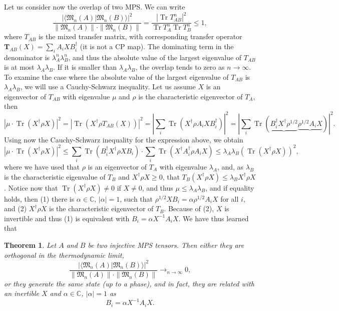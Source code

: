 \documentclass{article}
\newtheorem{theorem}{Theorem}
\newcommand{\tr}{\operatorname{Tr}}
\newcommand{\scalprod}[2]{\langle #1 \vert #2 \rangle}
\begin{document}
Let us consider now the overlap of two MPS. We can write
\begin{equation*}
  \frac{|\scalprod{\mathfrak{M}_n(A)}{\mathfrak{M}_n(B)}|^2}{\|\mathfrak{M}_n(A)\|\cdot\|\mathfrak{M}_n(B)\|} = \frac{|\tr T_{AB}^n|^2}{\tr T_A^n \tr T_B^n} \leq 1,
\end{equation*}
where $T_{AB}$ is the mixed transfer matrix, with corresponding transfer operator $\mathbf{T}_{AB}(X) = \sum_i A_i X B_i^\dagger$ (it is not a CP map). The dominating term in the denominator is $\lambda_A^n\lambda_B^n$, and thus the absolute value of the largest eigenvalue of $T_{AB}$ is at most $\lambda_A \lambda_B$. If it is smaller than $\lambda_A\lambda_B$, the overlap tends to zero as $n\to \infty$. To examine the case where the absolute value of the largest eigenvalue of $T_{AB}$ is $\lambda_A \lambda_B$, we will use a Cauchy-Schwarz inequality. Let us assume $X$ is an eigenvector of $T_{AB}$ with eigenvalue $\mu$ and $\rho$ is the characteristic eigenvector of $T_A$, then 
\begin{equation*}
  \left|\mu \cdot \tr(X^\dagger\rho X)\right|^2 = |\tr(X^\dagger \rho T_{AB}(X) )|^2 = \left|\sum_i \tr(X^\dagger \rho  A_i X B_i^\dagger )\right|^2 = \left|\sum_i \tr(\underbrace{B_i^\dagger  X^\dagger \rho^{1/2}}\underbrace{\rho^{1/2}  A_i X} )\right|^2.
\end{equation*}
Using now the Cauchy-Schwarz inequality for the expression above, we obtain
\begin{equation*}
  \left|\mu \cdot \tr(X^\dagger\rho X)\right|^2  \leq \sum_i \tr(B_i^\dagger X^\dagger \rho X B_i) \cdot \sum_i \tr(X^\dagger A_i^\dagger \rho A_i X) \leq \lambda_A\lambda_B \left(\tr(X^\dagger \rho X)\right)^2,
\end{equation*}
where we have used that $\rho$ is an eigenvector of $T_A$ with eigenvalue $\lambda_A$, and, as $\lambda_B$ is the characteristic eigenvalue of $T_B$ and $X^\dagger \rho X\geq 0$, that $T_B(X^\dagger \rho X)\leq \lambda_B X^\dagger \rho X$. Notice now that $\tr(X^\dagger \rho X) \neq 0$ if $X\neq 0$, and thus $\mu \leq \lambda_A\lambda_B$, and if equality holds, then (1) there is $\alpha\in\mathbb{C}$, $|\alpha|=1$,  such that $\rho^{1/2} X B_i = \alpha \rho^{1/2} A_i X$ for all $i$, and (2) $X^\dagger \rho X$ is the characteristic eigenvector of $T_B$. Because of (2), $X$ is invertible and thus (1) is equivalent with $B_i = \alpha X^{-1} A_i X$. We have thus learned that 
\begin{theorem}
  Let $A$ and $B$ be two injective MPS tensors. Then either they are orthogonal in the thermodynamic limit,
  \begin{equation*}
   \frac{|\scalprod{\mathfrak{M}_n(A)}{\mathfrak{M}_n(B)}|^2}{\|\mathfrak{M}_n(A)\|\cdot\|\mathfrak{M}_n(B)\|} \rightarrow_{n\to\infty} 0,
  \end{equation*} 
  or they generate the same state (up to a phase), and in fact, they are related with an inertible $X$ and $\alpha\in \mathbb{C}$, $|\alpha|=1$ as 
  \begin{equation*}
    B_i = \alpha X^{-1} A_i X.
  \end{equation*}
\end{theorem}
\appendix
\end{document}
